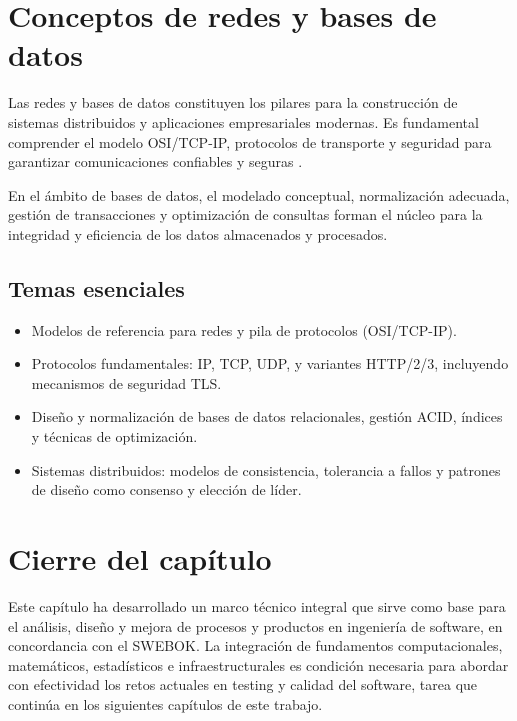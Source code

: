 \section{Conceptos de redes y bases de datos}
Las redes y bases de datos constituyen los pilares para la construcción de sistemas distribuidos y aplicaciones empresariales modernas. Es fundamental comprender el modelo OSI/TCP-IP, protocolos de transporte y seguridad para garantizar comunicaciones confiables y seguras \parencite{silberschatz2010,swebok2024}.

En el ámbito de bases de datos, el modelado conceptual, normalización adecuada, gestión de transacciones y optimización de consultas forman el núcleo para la integridad y eficiencia de los datos almacenados y procesados.

\subsection*{Temas esenciales}
\begin{itemize}
  \item Modelos de referencia para redes y pila de protocolos (OSI/TCP-IP).
  \item Protocolos fundamentales: IP, TCP, UDP, y variantes HTTP/2/3, incluyendo mecanismos de seguridad TLS.
  \item Diseño y normalización de bases de datos relacionales, gestión ACID, índices y técnicas de optimización.
  \item Sistemas distribuidos: modelos de consistencia, tolerancia a fallos y patrones de diseño como consenso y elección de líder.
\end{itemize}


\section*{Cierre del capítulo}
Este capítulo ha desarrollado un marco técnico integral que sirve como base para el análisis, diseño y mejora de procesos y productos en ingeniería de software, en concordancia con el SWEBOK. La integración de fundamentos computacionales, matemáticos, estadísticos e infraestructurales es condición necesaria para abordar con efectividad los retos actuales en testing y calidad del software, tarea que continúa en los siguientes capítulos de este trabajo.
